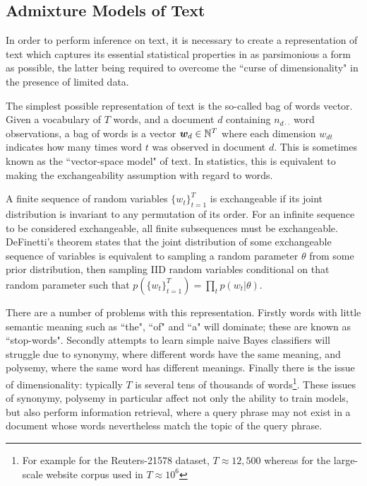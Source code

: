 

\subsection{Admixture Models of Text}
In order to perform inference on text, it is necessary to create a representation of text which captures its essential statistical properties in as parsimonious a form as possible, the latter being required to overcome the ``curse of dimensionality"\cite{Bishop2006} in the presence of limited data.

The simplest possible representation of text is the so-called bag of words vector. Given a vocabulary of $T$ words, and a document $d$ containing $n_{d\cdot\cdot}$ word observations, a bag of words is a vector $\bm w_d \in { \mathbb{N}^{T} }$ where each dimension $w_{dt}$ indicates how many times word $t$ was observed in document $d$. This is sometimes known as the ``vector-space model"\cite{Jst2004} of text. In statistics, this is equivalent to making the exchangeability assumption with regard to words. 

A finite sequence of random variables $\{w_t\}_{t=1}^{T}$ is exchangeable if its joint distribution is invariant to any permutation of its order. For an infinite sequence to be considered exchangeable, all finite subsequences must be exchangeable. DeFinetti's theorem\cite{Hewitt1955} states that the joint distribution of some exchangeable sequence of variables is equivalent to sampling a random parameter $\theta$ from some prior distribution, then sampling IID random variables conditional on that random parameter such that $p\left(\{w_t\}_{t=1}^{T}\right) = \prod_t p(w_t | \theta)$.

There are a number of problems with this representation. Firstly words with little semantic meaning such as ``the", ``of" and ``a" will dominate; these are known as ``stop-words". Secondly attempts to learn simple naive Bayes classifiers\cite{Nigam2000} will struggle due to synonymy, where different words have the same meaning, and polysemy, where the same word has different meanings. Finally there is the issue of dimensionality: typically $T$ is several tens of thousands of words\footnote{For example for the Reuters-21578 dataset, $T\approx 12,500$ whereas for the large-scale website corpus used in\cite{Smola2010} $T \approx 10^6$}. These issues of synonymy, polysemy in particular affect not only the ability to train models, but also perform information retrieval, where a query phrase may not exist in a document whose words nevertheless match the topic of the query phrase.

